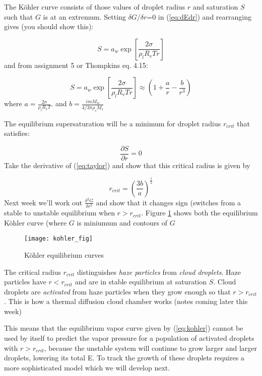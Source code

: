 \documentclass[12pt]{article}
\begin{document}
\noindent
The K\"ohler curve consists of those values of droplet radius $r$ and
saturation $S$ such that $G$ is at an extremum.  Setting $\delta G/\delta r$=0 in (\ref{eq:dEdr})
and rearranging gives (you should show this):

\begin{equation}
  \label{eq:kohler}
  S= a_w \exp \left [ \frac{2\sigma}{\rho_l R_v T r} \right ]
\end{equation}
and from assignment 5 or Thompkins eq. 4.15:

\begin{equation}
  \label{eq:taylor}
S= a_w \exp \left [ \frac{2\sigma}{\rho_l R_v T r} \right ] \approx \left ( 1 + \frac{a}{r} - \frac{b}{r^3} \right )
\end{equation}
where
$a=\frac{2 \sigma}{\rho_l R_v T}$.
and  $b= \frac{i m M_w}{ 4/3\pi \rho_s M_s}$

The equilibrium supersaturation will be a minimum for droplet radius $r_{crit}$ that satisfies:

\begin{equation}
\label{eq:minS}
\frac{\partial S}{\partial r} = 0
\end{equation}
Take the derivative of (\ref{eq:taylor}) and show that this critical radius is given by

\begin{equation}
  \label{eq:rcrit}
  r_{crit}  = \left ( \frac{3b}{a} \right )^\frac{1}{2}
\end{equation}
Next week we'll work out $\frac{\delta ^2 G}{\delta r^2}$ 
and show that
it changes sign (switches from a stable to unstable
equilibrium when $r > r_{crit}$.
Figure \ref{fig:kohler} shows both the equilibrium K\"ohler curve (where $G$
is miniumum and contours of $G$

\begin{figure}
  \centering
\texttt{[image: kohler\_fig]}
  \caption{K\"ohler equilibrium curves}
  \label{fig:kohler}
\end{figure}

The critical radius $r_{crit}$ 
distinguishes \textit{haze particles} from \textit{cloud droplets}.
Haze particles have $r < r_{crit}$ and are in stable equilibrium at
saturation $S$. Cloud droplets are \textit{activated} from haze
particles when they grow enough so that $r > r_{crit}$.  This is how
a thermal diffusion cloud chamber works (notes coming later this week)

This means that the equilibrium vapor curve given by (\ref{eq:kohler}) cannot
be used by itself to predict the vapor pressure for a population of
activated droplets with $r > r_{crit}$, because the unstable system will
continue to grow larger and larger droplets, lowering its total
E.  To track the growth of these droplets requires a more sophisticated
model which we will develop next.
\end{document}
